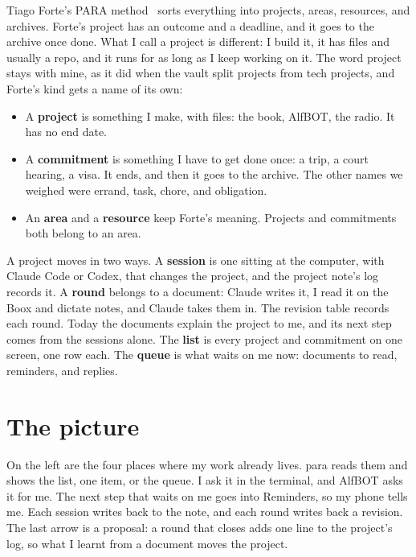 \documentclass[11pt,a4paper]{article}
\newcommand{\n}[1]{\textsf{#1}}
\begin{document}
Tiago Forte's PARA method~\cite{para} sorts everything into projects, areas, resources, and archives. Forte's project has an outcome and a deadline, and it goes to the archive once done. %
What I call a project is different: I build it, it has files and usually a repo, and it runs for as long as I keep working on it. The word project stays with mine, as it did when the vault split projects from tech projects, and Forte's kind gets a name of its own:
\begin{itemize}
  \item A \textbf{project} is something I make, with files: the book, \n{AlfBOT}, the radio. It has no end date.
  \item A \textbf{commitment} is something I have to get done once: a trip, a court hearing, a visa. It ends, and then it goes to the archive. The other names we weighed were errand, task, chore, and obligation.
  \item An \textbf{area} and a \textbf{resource} keep Forte's meaning. Projects and commitments both belong to an area.
\end{itemize}
A project moves in two ways. A \textbf{session} is one sitting at the computer, with \n{Claude Code} or \n{Codex}, that changes the project, and the project note's log records it. A \textbf{round} belongs to a document: Claude writes it, I read it on the Boox and dictate notes, and Claude takes them in. The revision table records each round. Today the documents explain the project to me, and its next step comes from the sessions alone.
The \textbf{list} is every project and commitment on one screen, one row each. The \textbf{queue} is what waits on me now: documents to read, reminders, and replies.

\section{The picture}

On the left are the four places where my work already lives. \n{para} reads them and shows the list, one item, or the queue. I ask it in the terminal, and \n{AlfBOT} asks it for me. The next step that waits on me goes into \n{Reminders}, so my phone tells me. Each session writes back to the note, and each round writes back a revision. The last arrow is a proposal: a round that closes adds one line to the project's log, so what I learnt from a document moves the project.
\end{document}
